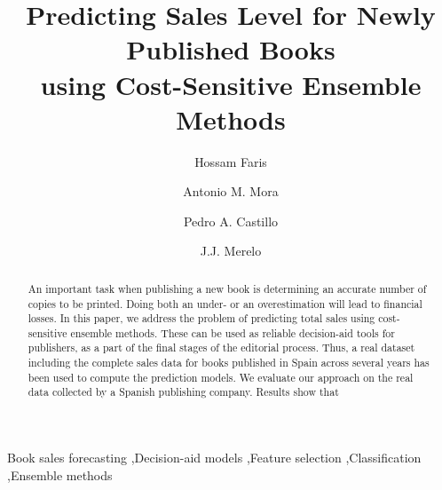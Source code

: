 \documentclass[a4paper,10pt,onecolumn,preprint,3p]{elsarticle}
\begin{document}
\begin{frontmatter}

\title{Predicting Sales Level for Newly Published Books \\
using Cost-Sensitive Ensemble Methods}


\author[abd]{Hossam Faris}
\author[ugrtstc]{Antonio M. Mora}
\author[ugratc]{Pedro A. Castillo}
\author[ugratc]{J.J. Merelo}


\address[abd]{Business Information Technology Department, King Abdullah II School for Information Technology \\
The University of Jordan, Amman, Jordan}
\address[ugrtstc]{Department of Signal Theory, Telematics and Communications, ETSIIT and CITIC \\
University of Granada, Granada, Spain}
\address[ugratc]{Department of Computer Architecture and Computer Technology, ETSIIT and CITIC \\
University of Granada, Granada, Spain}


\begin{abstract}
An important task when publishing a new book is determining an accurate number 
of copies to be printed. Doing both an under- or an overestimation will lead to financial losses.
In this paper, we address the problem of predicting total sales using cost-sensitive ensemble methods.
These can be used as reliable decision-aid tools for publishers, as a part of the final stages of the editorial process. 
Thus, a real dataset including the complete sales data for books published in Spain across several years has been used to compute the prediction models.
We evaluate our approach on the real data collected by a Spanish publishing company.
Results show that %

\end{abstract}


\begin{keyword}
Book sales forecasting \sep Decision-aid models \sep Feature selection \sep Classification \sep Ensemble methods
\end{keyword}

\end{frontmatter}
\end{document}
